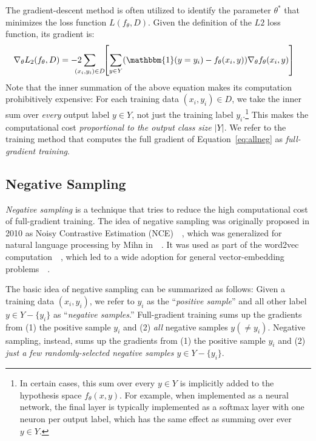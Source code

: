 The gradient-descent method is often utilized to identify the parameter $\theta^*$ that minimizes the loss function $L(f_{\theta}, D)$. Given the definition of the $L2$ loss function, its gradient is:
\small
\begin{align}
&\nabla_{\theta} L_2(f_{\theta},D) = 
 -2\!\!\!\!\!\!\sum_{(x_i,y_i)\in D} \!\!\left[\sum_{y \in Y} 
(\mathbbm{1}(y=y_i) - f_{\theta}(x_i, y)) \nabla_{\theta} f_{\theta}(x_i, y)\right] \label{eq:allneg}    
\end{align}
\normalsize
Note that the inner summation of the above equation makes its computation prohibitively expensive: For each training data $(x_i, y_i) \in D$, we take the inner sum over \emph{every} output label $y \in Y$, not just the training label $y_i$.\footnote{In certain cases, this sum over every $y \in Y$ is implicitly added to the hypothesis space $f_{\theta}(x,y)$. For example, when implemented as a neural network, the final layer is typically implemented as a softmax layer with one neuron per output label, which has the same effect as summing over ever $y \in Y$.} This makes the computational cost \emph{proportional to the output class size $|Y|$}. We refer to the training method that computes the full gradient of Equation~\ref{eq:allneg} as \emph{full-gradient training}. 

\subsection{Negative Sampling}
\label{sec:negative}
\emph{Negative sampling} is a technique that tries to reduce the high computational cost of full-gradient training. The idea of negative sampling was originally proposed in 2010 as Noisy Contrastive Estimation (NCE)~~\citep{NCE}, which was generalized for natural language processing by Mihn in~~\citep{mnih2012fast}. It was used as part of the word2vec computation~~\citep{mikolov2013efficient}, which led to a wide adoption for general vector-embedding problems~~\citep{node2vec-kdd2016,barkan2016item2vec,grover2016node2vec}.

The basic idea of negative sampling can be summarized as follows: Given a training data $(x_i, y_i)$, we refer to $y_i$ as the ``\emph{positive sample}'' and all other label $y \in Y - \{y_i\}$ as ``\emph{negative samples}.''  Full-gradient training sums up the gradients from (1) the positive sample $y_i$ and (2) \emph{all} negative samples $y (\neq y_i)$. Negative sampling, instead, sums up the gradients from (1) the positive sample $y_i$ and (2) \emph{just a few randomly-selected negative samples $y \in Y- \{y_i\}$}.


